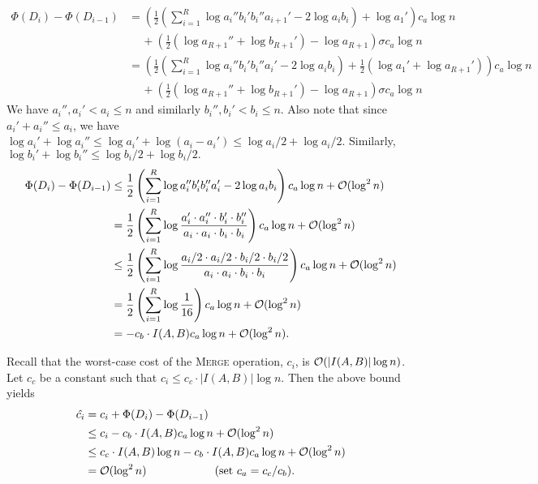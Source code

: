 \documentclass[11pt]{article}
\newcommand{\kwUnion}{Merge}
\newcommand{\Union}{\mbox{\textsc{\kwUnion{}}}}
\newcommand{\cons}[1]{\ensuremath{c_{#1}}}
\newcommand{\cnsa}{\cons a}
\newcommand{\cnsb}{\cons b}
\newcommand{\cnsc}{\cons c}
\newcommand{\isodd}{\ensuremath{\sigma}}
\newcommand{\intsubs}[2]{\ensuremath{I(\set{#1},\set{#2})}}
\newcommand{\intnum}[2]{\ensuremath{|I(\set{#1},\set{#2})|}}
\newcommand{\set}[1]{\ensuremath{#1}}
\newcommand{\agap}[1]{\ensuremath{a_{#1}}}
\newcommand{\leftofa}[1]{\ensuremath{a_{#1}'}}
\newcommand{\rightofa}[1]{\ensuremath{a_{#1}''}}
\newcommand{\bgap}[1]{\ensuremath{b_{#1}}}
\newcommand{\leftofb}[1]{\ensuremath{b_{#1}'}}
\newcommand{\rightofb}[1]{\ensuremath{b_{#1}''}}
\newcommand{\datast}[1]{\ensuremath{D_{#1}}}
\newcommand{\potfun}[1]{\ensuremath{\Phi(#1)}}
\newcommand{\amcost}[1]{\ensuremath{\hat{c_{#1}}}}
\newcommand{\actcost}[1]{\ensuremath{c_{#1}}}
\begin{document}
{\allowdisplaybreaks 
\begin{align*} 
\potfun{\datast i} - \potfun{\datast{i-1}} &= \left(\frac{1}{2}\left(\sum_{i=1}^R  \log \rightofa i \leftofb i \rightofb i \leftofa{i+1} - 2\log \agap i \bgap i\right)+\log \leftofa 1 \right)\cnsa\log n\\ 
& \quad\, +\left(\frac{1}{2}\left(\log \rightofa{R+1} + \log \leftofb{R+1}\right) -\log \agap{R+1} \right)\isodd \cnsa\log n  \\ 
&=\left(\frac{1}{2}\left(\sum_{i=1}^R  \log \rightofa i \leftofb i \rightofb i \leftofa i - 2\log \agap i \bgap i\right)+\frac{1}{2}\left(\log \leftofa 1 + \log \leftofa{R+1}\right)\right)\cnsa\log n\\ 
& \quad\, +\left(\frac{1}{2}\left(\log \rightofa{R+1} + \log \leftofb{R+1}\right) -\log \agap{R+1} \right)\isodd \cnsa\log n 
\end{align*} 
We have $\rightofa i, \leftofa i < \agap i \leq n$ and similarly $\rightofb i, \leftofb i < \bgap i \leq n$. Also note that since $\leftofa i + \rightofa i \leq \agap i$, we have $\log \leftofa i + \log \rightofa i \leq  \log \leftofa i + \log (\agap i - \leftofa i)\leq \log \agap i/2 + \log \agap i/2.$ Similarly, $\log \leftofb i + \log \rightofb i \leq \log \bgap i/2 + \log \bgap i/2.$ 
\begin{align*} 
\potfun{\datast i} - \potfun{\datast{i-1}}&\leq \frac{1}{2}\left(\sum_{i=1}^R  \log \rightofa i \leftofb i \leftofb i' \leftofa i - 2\log \agap i \bgap i\right)\cnsa\log n + {\cal O}(\log^2 n)\\ 
&= \frac{1}{2}\left(\sum_{i=1}^R \log \frac{ \leftofa i\cdot \rightofa i\cdot \leftofb i \cdot \rightofb i}{ \agap i \cdot \agap i\cdot \bgap i\cdot \bgap i}\right)\cnsa\log n + {\cal O}(\log^2 n)\\ 
&\leq \frac{1}{2}\left(\sum_{i=1}^R \log \frac{ \agap i/2\cdot \agap i/2\cdot \bgap i/2 \cdot \bgap i/2}{ \agap i\cdot \agap i\cdot \bgap i\cdot \bgap i}\right)\cnsa\log n + {\cal O}(\log^2 n)\\ 
&= \frac{1}{2}\left(\sum_{i=1}^R \log \frac{ 1}{ 16}\right)\cnsa\log n + {\cal O}(\log^2 n)\\ 
&= -\cnsb\cdot I(A,B)\cnsa\log n +{\cal O}(\log^2 n).
\end{align*}} 


Recall that the worst-case cost of the \Union{} operation, $\actcost i$, is ${\cal O}(\intnum{A}{B}\log n)$. Let $\cnsc$ be a constant such that $\actcost i \leq \cnsc\cdot\intnum{A}{B}\log n$. Then the above bound yields 
\begin{align*} 
\amcost i &= \actcost i + \potfun{\datast i} - \potfun{\datast{i-1}}\\ 
&\leq \actcost i - \cnsb\cdot \intsubs{A}{B}\cnsa\log n + {\cal O}(\log^2 n)\\ 
&\leq \cnsc\cdot \intsubs{A}{B}\log n - \cnsb\cdot \intsubs{A}{B}\cnsa\log n + {\cal O}(\log^2 n)\\ 
&= {\cal O}(\log^2 n) \qquad\qquad\qquad \mbox{(set }\cnsa=\cnsc/\cnsb). 
\end{align*} 
\end{document}
